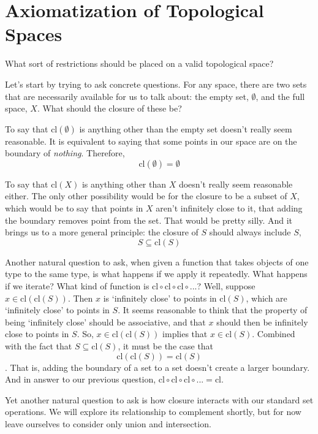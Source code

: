 \documentclass{report}
\newcommand{\cl}{\mathrm{cl}}
\begin{document}
\section{Axiomatization of Topological Spaces}

What sort of restrictions should be placed on a valid topological space?

Let's start by trying to ask concrete questions. For any space, there are two sets that are necessarily available for us to talk about: the empty set, $∅$, and the full space, $X$. What should the closure of these be?

To say that $\cl(∅)$ is anything other than the empty set doesn't really seem reasonable. It is equivalent to saying that some points in our space are on the boundary of \emph{nothing}. Therefore, 
\begin{equation}
\cl(∅) = ∅ \tag{Closure 1}
\end{equation}

To say that $\cl(X)$ is anything other than $X$ doesn't really seem reasonable either. The only other possibility would be for the closure to be a subset of $X$, which would be to say that points in $X$ aren't infinitely close to it, that adding the boundary removes point from the set. That would be pretty silly. And it brings us to a more general principle: the closure of $S$ should always include $S$,
\begin{equation}
S ⊆ \cl(S) \tag{Closure 2}
\end{equation}

Another natural question to ask, when given a function that takes objects of one type to the same type, is what happens if we apply it repeatedly. What happens if we iterate? What kind of function is $\cl ∘ \cl ∘ \cl ∘ ...$? Well, suppose $x ∈ \cl(\cl(S))$. Then $x$ is `infinitely close' to points in $\cl(S)$, which are `infinitely close' to points in $S$. It seems reasonable to think that the property of being `infinitely close' should be associative, and that $x$ should then be infinitely close to points in $S$. So, $x ∈ \cl(\cl(S))$ implies that $x ∈ \cl(S)$. Combined with the fact that $S ⊆ \cl(S)$, it must be the case that 
\begin{equation}
\cl(\cl(S)) = \cl(S) \tag{Closure 3}
\end{equation}
. That is, adding the boundary of a set to a set doesn't create a larger boundary. And in answer to our previous question, $\cl ∘ \cl ∘ \cl ∘ ... = \cl$.

Yet another natural question to ask is how closure interacts with our standard set operations. We will explore its relationship to complement shortly, but for now leave ourselves to consider only union and intersection.
\end{document}
